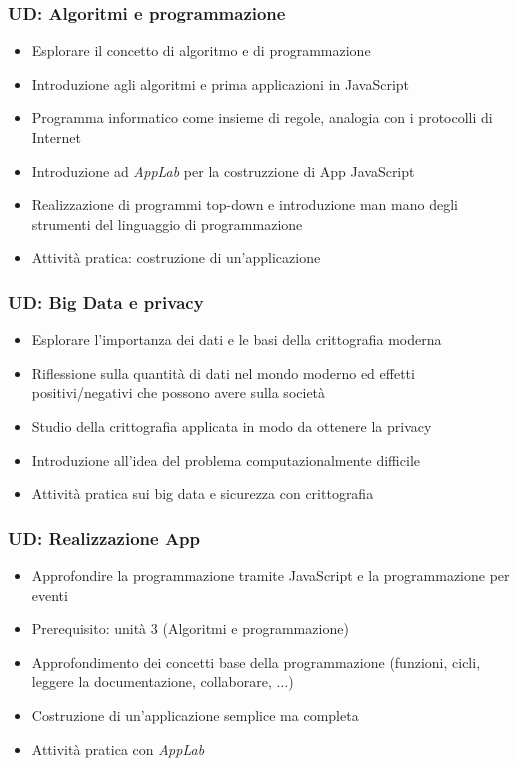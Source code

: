 \documentclass[
    hyperref={colorlinks,citecolor=black,linkcolor=black,urlcolor=blue}
]{beamer}
\begin{document}
\begin{frame}
  \frametitle{UD: Algoritmi e programmazione}

  \begin{itemize}
    \item Esplorare il concetto di algoritmo e di programmazione
    \item Introduzione agli algoritmi e prima applicazioni in JavaScript
    \item Programma informatico come insieme di regole, analogia con i protocolli di Internet
    \item Introduzione ad \emph{AppLab} per la costruzzione di App JavaScript
    \item Realizzazione di programmi top-down e introduzione man mano degli strumenti del linguaggio di programmazione
    \item Attività pratica: costruzione di un'applicazione
  \end{itemize}
\end{frame}

\begin{frame}
  \frametitle{UD: Big Data e privacy}

  \begin{itemize}
    \item Esplorare l'importanza dei dati e le basi della crittografia moderna
    \item Riflessione sulla quantità di dati nel mondo moderno ed effetti positivi/negativi che possono avere sulla società
    \item Studio della crittografia applicata in modo da ottenere la privacy
    \item Introduzione all'idea del problema computazionalmente difficile
    \item Attività pratica sui big data e sicurezza con crittografia
  \end{itemize}
\end{frame}

\begin{frame}
  \frametitle{UD: Realizzazione App}

  \begin{itemize}
    \item Approfondire la programmazione tramite JavaScript e la programmazione per eventi
    \item Prerequisito: unità 3 (Algoritmi e programmazione)
    \item Approfondimento dei concetti base della programmazione (funzioni, cicli, leggere la documentazione, collaborare, ...)
    \item Costruzione di un'applicazione semplice ma completa
    \item Attività pratica con \emph{AppLab}
  \end{itemize}
\end{frame}
\end{document}
